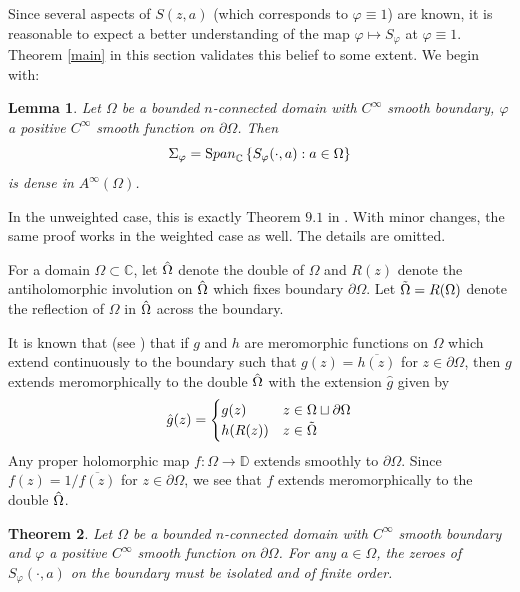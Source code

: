 \documentclass[11pt, reqno]{amsart}
\newtheorem{thm}{Theorem}[section]
\newtheorem{lem}[thm]{Lemma}
\numberwithin{equation}{section}
\newcommand{\mbb}{\mathbb}
\begin{document}
Since several aspects of $S(z, a)$ (which corresponds to $\varphi \equiv 1$) are known, it is reasonable to expect a better understanding of the map $\varphi \mapsto S_{\varphi}$ at $\varphi \equiv 1$. Theorem \ref{main} in this section validates this belief to some extent. We begin with:

\begin{lem}\label{density}
Let $\Omega$ be a bounded $n$-connected domain with $C^{\infty}$ smooth boundary, $\varphi$ a positive $C^{\infty}$ smooth function on $\partial\Omega$. Then
\[
\Sigma_{\varphi} = {\text Span}_{\mbb C}\left\lbrace S_{\varphi}(\cdot,a) : a\in\Omega \right\rbrace
\]
is dense in $A^{\infty}(\Omega)$. 
\end{lem}

In the unweighted case, this is exactly Theorem $9.1$ in \cite{Be0}. With minor changes, the same proof works in the weighted case as well. The details are omitted.

\medskip

For a domain $\Omega\subset\mathbb{C}$, let $\Hat{\Omega}$ denote the double of $\Omega$ and $R(z)$ denote the antiholomorphic involution on $\Hat{\Omega}$ which fixes boundary $\partial\Omega$. Let $\Tilde{\Omega}=R(\Omega)$ denote the reflection of $\Omega$ in $\Hat{\Omega}$ across the boundary.

\medskip

It is known that (see \cite{Be0}) that if $g$ and $h$ are meromorphic functions on $\Omega$ which extend continuously to the boundary such that $g(z) = \overline{h(z)}$ for $z\in \partial\Omega$, then $g$ extends meromorphically to the double $\Hat{\Omega}$ with the extension $\hat{g}$ given by
\[
\hat{g}(z) = 
\begin{cases}
g(z) & z\in \Omega \sqcup \partial\Omega\\
h(R(z)) & z\in \Tilde{\Omega}
\end{cases}
\]
Any proper holomorphic map $f:\Omega\rightarrow\mathbb{D}$ extends smoothly to $\partial\Omega$. Since $f(z) = 1/\overline{f(z)}$ for $z\in\partial\Omega$, we see that $f$ extends meromorphically to the double $\Hat{\Omega}$. 

\medskip

\begin{thm}\label{Bell1}
Let $\Omega$ be a bounded $n$-connected domain with $C^{\infty}$ smooth boundary and $\varphi$ a positive $C^{\infty}$ smooth function on $\partial\Omega$. For any $a\in\Omega$, the zeroes of $S_{\varphi}(\cdot, a)$ on the boundary must be isolated and of finite order.
\end{thm}
\end{document}
